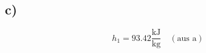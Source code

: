 

\subsection*{c)}
\begin{equation*}
h_1 = 93.42 \frac{\text{kJ}}{\text{kg}} \quad (\text{aus a})
\end{equation*}